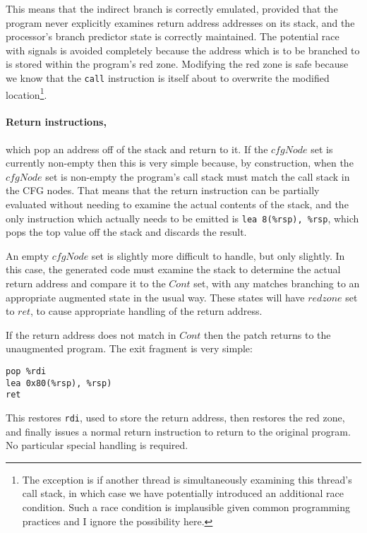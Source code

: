 This means that the indirect branch is correctly emulated, provided
that the program never explicitly examines return address addresses on
its stack, and the processor's branch predictor state is correctly
maintained.  The potential race with signals is avoided completely
because the address which is to be branched to is stored within the
program's red zone.  Modifying the red zone is safe because we know
that the \verb|call| instruction is itself about to overwrite the
modified location\footnote{The exception is if another thread is
  simultaneously examining this thread's call stack, in which case we
  have potentially introduced an additional race condition.  Such a
  race condition is implausible given common programming practices and
  I ignore the possibility here.}.

\paragraph{Return instructions,} which pop an address off of the stack
and return to it.  If the $cfgNode$ set is currently non-empty then
this is very simple because, by construction, when the $cfgNode$ set
is non-empty the program's call stack must match the call stack in the
CFG nodes.  That means that the return instruction can be partially
evaluated without needing to examine the actual contents of the stack,
and the only instruction which actually needs to be emitted is
\verb|lea 8(%rsp), %rsp|, which pops the top value off the stack and
discards the result.  

An empty $cfgNode$ set is slightly more difficult to handle, but only
slightly.  In this case, the generated code must examine the stack to
determine the actual return address and compare it to the $Cont$ set,
with any matches branching to an appropriate augmented state in the
usual way.  These states will have $redzone$ set to $ret$, to cause
appropriate handling of the return address.

If the return address does not match in $Cont$ then the patch returns
to the unaugmented program.  The exit fragment is very simple:

\begin{verbatim}
pop %rdi
lea 0x80(%rsp), %rsp)
ret
\end{verbatim}

This restores \verb|rdi|, used to store the return address, then
restores the red zone, and finally issues a normal return instruction
to return to the original program.  No particular special handling is
required.


